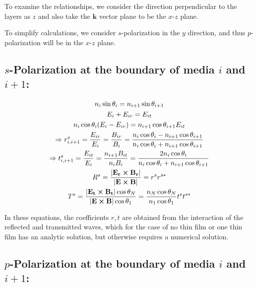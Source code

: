 \documentclass{article}
\begin{document}
	To examine the relationships, we consider the direction perpendicular to the layers as $z$ and also take the $\mathbf{k}$ vector plane to be the $x$-$z$ plane.

	To simplify calculations, we consider $s$-polarization in the $y$ direction, and thus $p$-polarization will be in the $x$-$z$ plane.
	
	
	
	
	\subsection*{$s$-Polarization at the boundary of media $i$ and $i+1$:}
	
	\begin{gather*}
		n_i \sin \theta_i= n _{i+1} \sin \theta_{i+1}\\
		E_i+E_{ir}=E_{it}\\
		n_i \cos \theta_i(	E_i-E_{ir})=n_{i+1}\cos \theta_{i+1} E_{it}\\
		\Rightarrow r^s_{i,i+1}=\frac{E_{ir}}{E_i}=\frac{B_{ir}}{B_i}=\frac{n_i \cos \theta_i-n_{i+1}\cos \theta_{i+1}}{n_i \cos \theta_i+n_{i+1}\cos \theta_{i+1}}\\
		\Rightarrow t^s_{i,i+1}=\frac{E_{it}}{E_i}=\frac{n_{i+1} B_{it}}{n_i B_i}=\frac{2n_i \cos \theta_i}{n_i \cos \theta_i+n_{i+1}\cos \theta_{i+1}}\\
		R^s=\frac{|\mathbf{E_{r}}\cross \mathbf{B_{r}}|}{|\mathbf{E}\cross \mathbf{B}|}=r^s r^{s*}\\
		T^s=\frac{|\mathbf{E_{t}}\cross \mathbf{B_{t}}|\cos \theta_{N}}{|\mathbf{E}\cross \mathbf{B}|\cos \theta_1}=\frac{n_N\cos \theta_N}{n_1\cos \theta_1} t^s t^{s*}
	\end{gather*}
	
	In these equations, the coefficients $r,t$ are obtained from the interaction of the reflected and transmitted waves, which for the case of no thin film or one thin film has an analytic solution, but otherwise requires a numerical solution.
	
	\newpage
	\subsection*{$p$-Polarization at the boundary of media $i$ and $i+1$:}
	
\end{document}
